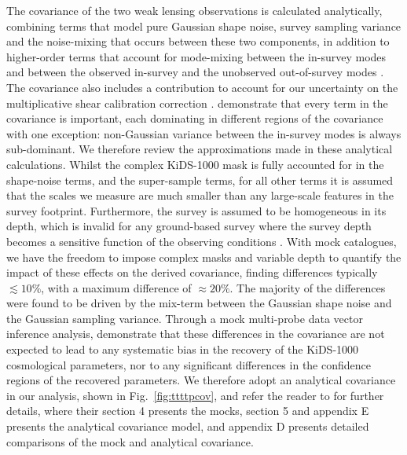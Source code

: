 The covariance of the two weak lensing observations is calculated analytically, combining terms that model pure Gaussian shape noise, survey sampling variance and the noise-mixing that occurs between these two components, in addition to higher-order terms that account for mode-mixing between the in-survey modes and between the observed in-survey and the unobserved out-of-survey modes \citep[known as super-sample covariance,][]{takada/hu:2013}. 
The covariance also includes a contribution to account for our uncertainty on the multiplicative shear calibration correction \citep{kannawadi/etal:2019}. \citet{joachimi/etal:inprep} demonstrate that every term in the covariance is important, each dominating in different regions of the covariance with one exception: non-Gaussian variance between the in-survey modes is always sub-dominant.  We therefore review the approximations made in these analytical calculations.   
Whilst the complex KiDS-1000 mask is fully accounted for in the shape-noise terms, and the super-sample terms, for all other terms it is assumed that the scales we measure are much smaller than any large-scale features in the survey footprint. 
Furthermore, the survey is assumed to be homogeneous in its depth, which is invalid for any ground-based survey where the survey depth becomes a sensitive function of the observing conditions \citep{heydenreich/etal:2020}.   With mock catalogues, we have the freedom to impose complex masks and variable depth to quantify the impact of these effects on the derived covariance, finding differences typically $\lesssim 10\%$, with a maximum difference of $\approx\!20 \%$.  The majority of the differences were found to be driven by the mix-term between the Gaussian shape noise and the Gaussian sampling variance.    Through a mock multi-probe data vector inference analysis, \citet{joachimi/etal:inprep} demonstrate that these differences in the covariance are not expected to lead to any systematic bias in the recovery of the KiDS-1000 cosmological parameters, nor to any significant differences in the confidence regions of the recovered parameters.   We therefore adopt an analytical covariance in our analysis,  shown in Fig.~\ref{fig:ttttpcov}, and refer the reader to \citet{joachimi/etal:inprep} for further details, where their section 4 presents the mocks, section 5 and appendix E presents the analytical covariance model, and appendix D presents detailed comparisons of the mock and analytical covariance.

